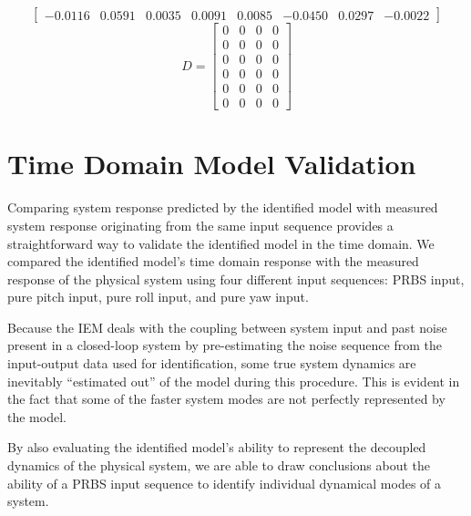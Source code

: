 \begin{table}[!htb]
{\begin{minipage}{5.5in}
\begin{equation*}
\begin{bmatrix}
-0.0116&0.0591&0.0035&0.0091&0.0085&-0.0450&0.0297&-0.0022
\end{bmatrix}
\end{equation*} 
\begin{equation*}
D = \begin{bmatrix}
0&0&0&0\\
0&0&0&0\\
0&0&0&0\\
0&0&0&0\\
0&0&0&0\\
0&0&0&0
\end{bmatrix}
\end{equation*}
\normalsize %
\end{minipage}}
\label{identified_system_matrices}
\end{table}









\newpage
\section{Time Domain Model Validation}
Comparing system response predicted by the identified model with measured system response originating from the same input sequence provides a straightforward way to validate the identified model in the time domain. We compared the identified model's time domain response with the measured response of the physical system using four different input sequences: PRBS input, pure pitch input, pure roll input, and pure yaw input. 

Because the IEM deals with the coupling between system input and past noise present in a closed-loop system by pre-estimating the noise sequence from the input-output data used for identification, some true system dynamics are inevitably ``estimated out'' of the model during this procedure. This is evident in the fact that some of the faster system modes are not perfectly represented by the model.

By also evaluating the identified model's ability to represent the decoupled dynamics of the physical system, we are able to draw conclusions about the ability of a PRBS input sequence to identify individual dynamical modes of a system. 

